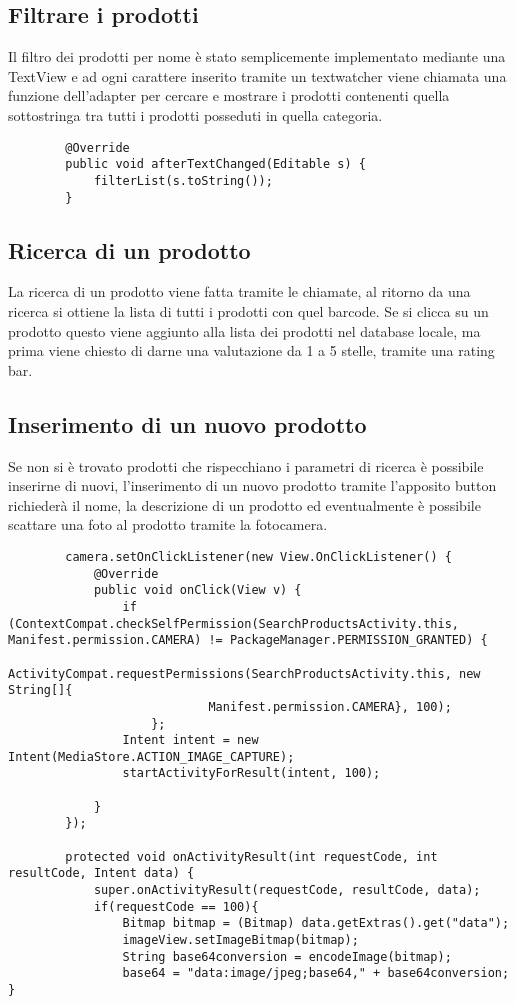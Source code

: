 \documentclass[11pt]{article}
\begin{document}
    \subsection{Filtrare i prodotti}
    Il filtro dei prodotti per nome è stato semplicemente implementato mediante una TextView e ad ogni carattere inserito
    tramite un textwatcher viene chiamata una funzione dell'adapter per cercare e mostrare i prodotti contenenti quella sottostringa
    tra tutti i prodotti posseduti in quella categoria.
    \begin{lstlisting}
        @Override
        public void afterTextChanged(Editable s) {
            filterList(s.toString());
        }
    \end{lstlisting}
    \subsection{Ricerca di un prodotto}
    La ricerca di un prodotto viene fatta tramite le chiamate, al ritorno da una ricerca si ottiene la lista di tutti i prodotti con 
    quel barcode. Se si clicca su un prodotto questo viene aggiunto alla lista dei prodotti nel database locale, ma prima viene chiesto di 
    darne una valutazione da 1 a 5 stelle, tramite una rating bar.
    \subsection{Inserimento di un nuovo prodotto}
    Se non si è trovato prodotti che rispecchiano i parametri di ricerca è possibile inserirne di nuovi, l'inserimento di un nuovo prodotto
    tramite l'apposito button richiederà il nome, la descrizione di un prodotto ed eventualmente è possibile scattare una foto al prodotto tramite 
    la fotocamera. 
    \begin{lstlisting}
        camera.setOnClickListener(new View.OnClickListener() {
            @Override
            public void onClick(View v) {
                if (ContextCompat.checkSelfPermission(SearchProductsActivity.this, Manifest.permission.CAMERA) != PackageManager.PERMISSION_GRANTED) {
                    ActivityCompat.requestPermissions(SearchProductsActivity.this, new String[]{
                            Manifest.permission.CAMERA}, 100);
                    };
                Intent intent = new Intent(MediaStore.ACTION_IMAGE_CAPTURE);
                startActivityForResult(intent, 100);

            }
        });

        protected void onActivityResult(int requestCode, int resultCode, Intent data) {
            super.onActivityResult(requestCode, resultCode, data);
            if(requestCode == 100){
                Bitmap bitmap = (Bitmap) data.getExtras().get("data");
                imageView.setImageBitmap(bitmap);
                String base64conversion = encodeImage(bitmap);
                base64 = "data:image/jpeg;base64," + base64conversion; }
    \end{lstlisting}
\end{document}
